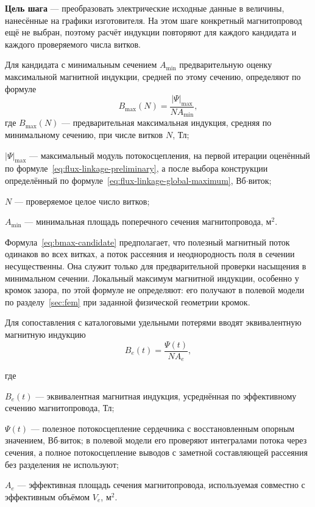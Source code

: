 \documentclass[14pt,a4paper]{extarticle}
\newenvironment{whereblock}
 {\par\noindent где\par
  \begin{list}{}{\setlength{\leftmargin}{12.5mm}
                  \setlength{\itemindent}{-12.5mm}
                  \setlength{\itemsep}{0pt}
                  \setlength{\parsep}{0pt}
                  \setlength{\topsep}{0pt}}}
 {\end{list}}
\newcommand{\whereitem}[2]{\item[] #1 --- #2}
\begin{document}
\textbf{Цель шага} --- преобразовать электрические исходные данные в
величины, нанесённые на графики изготовителя. На этом шаге конкретный
магнитопровод ещё не выбран, поэтому расчёт индукции повторяют для
каждого кандидата и каждого проверяемого числа витков.

Для кандидата с минимальным сечением $A_{\min}$ предварительную оценку
максимальной магнитной индукции, средней по этому сечению, определяют по
формуле
\begin{equation}
 B_{\max}(N)=
 \frac{\left|\Psi\right|_{\max}}{N A_{\min}},
 \label{eq:bmax-candidate}
\end{equation}
где $B_{\max}(N)$ --- предварительная максимальная индукция, средняя по
минимальному сечению, при числе витков $N$, Тл;\par\noindent
$\left|\Psi\right|_{\max}$ --- максимальный модуль потокосцепления,
на первой итерации оценённый по формуле~\eqref{eq:flux-linkage-preliminary},
а после выбора конструкции определённый по
формуле~\eqref{eq:flux-linkage-global-maximum},
Вб$\cdot$виток;\par\noindent
$N$ --- проверяемое целое число витков;\par\noindent
$A_{\min}$ --- минимальная площадь поперечного сечения
магнитопровода, м$^2$.

Формула~\eqref{eq:bmax-candidate} предполагает, что полезный магнитный
поток одинаков во всех витках, а поток рассеяния и неоднородность поля в
сечении несущественны. Она служит только для предварительной проверки
насыщения в минимальном сечении. Локальный максимум магнитной индукции,
особенно у кромок зазора, по этой формуле не определяют: его получают в
полевой модели по разделу~\ref{sec:fem} при заданной физической геометрии
кромок.

Для сопоставления с каталоговыми удельными потерями вводят эквивалентную
магнитную индукцию
\begin{equation}
 B_e(t)=\frac{\Psi(t)}{N A_e},
 \label{eq:b-equivalent-trajectory}
\end{equation}
\begin{whereblock}
\whereitem{$B_e(t)$}{эквивалентная магнитная индукция, усреднённая по
эффективному сечению магнитопровода, Тл;}
\whereitem{$\Psi(t)$}{полезное потокосцепление сердечника с восстановленным
опорным значением, Вб$\cdot$виток; в полевой модели его проверяют интегралами
потока через сечения, а полное потокосцепление выводов с заметной
составляющей рассеяния без разделения не используют;}
\whereitem{$A_e$}{эффективная площадь сечения магнитопровода, используемая
совместно с эффективным объёмом $V_e$, м$^2$.}
\end{whereblock}
\end{document}
